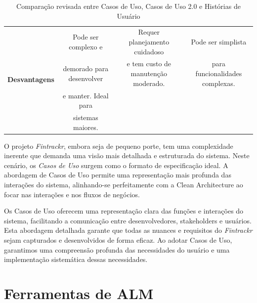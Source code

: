 \begin{table}[ht]
{\begin{tabular}{|c|c|c|c|}
			\multirow{4}{*}{\textbf{Desvantagens}} & Pode ser complexo e       & Requer planejamento cuidadoso         & Pode ser simplista                 \\
			                                       & demorado para desenvolver & e tem custo de manutenção moderado. & para funcionalidades complexas.    \\
			                                       & e manter. Ideal para      &                                       &                                    \\
			                                       & sistemas maiores.         &                                       &                                    \\ \hline
		\end{tabular}%
	}
	\caption{Comparação revisada entre Casos de Uso, Casos de Uso 2.0 e Histórias de Usuário}
	\label{tab:revised_comparison}
\end{table}

O projeto \textit{Fintrackr}, embora seja de pequeno porte, tem uma complexidade inerente que demanda uma visão mais detalhada e estruturada do sistema. Neste cenário, os \textit{Casos de Uso} surgem como o formato de especificação ideal. A abordagem de Casos de Uso permite uma representação mais profunda das interações do sistema, alinhando-se perfeitamente com a Clean Architecture ao focar nas interações e nos fluxos de negócios.

Os Casos de Uso oferecem uma representação clara das funções e interações do sistema, facilitando a comunicação entre desenvolvedores, stakeholders e usuários. Esta abordagem detalhada garante que todas as nuances e requisitos do \textit{Fintrackr} sejam capturados e desenvolvidos de forma eficaz. Ao adotar Casos de Uso, garantimos uma compreensão profunda das necessidades do usuário e uma implementação sistemática dessas necessidades.           

\section{Ferramentas de ALM}


